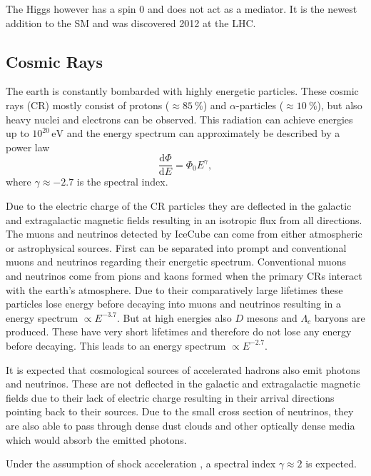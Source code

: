 The Higgs however has a spin $0$ and does not act as a mediator. It is the newest addition to the SM and was discovered 2012 at the LHC\cite{ATLAS:2012yve, CMS:2012qbp}. 

\subsection{Cosmic Rays}
The earth is constantly bombarded with highly energetic particles. These cosmic rays (CR) mostly consist of protons ($\approx \SI{85}{\percent}$) and $\alpha$-particles ($\approx \SI{10}{\percent}$), but also heavy nuclei and electrons can be observed. This radiation can achieve energies up to $10^{20}\,\si{\electronvolt}$ and the energy spectrum can approximately be described by a power law
\begin{equation}
  \frac{\mathrm{d}\Phi}{\mathrm{d}E} = \Phi_0 E^{\gamma},
\end{equation}
where $\gamma \approx - 2.7$ is the spectral index.

Due to the electric charge of the CR particles they are deflected in the galactic and extragalactic magnetic fields resulting in an isotropic flux from all directions.\\

The muons and neutrinos detected by IceCube can come from either atmospheric or astrophysical sources. First can be separated into prompt and conventional muons and neutrinos regarding their energetic spectrum. Conventional muons and neutrinos come from pions and kaons formed when the primary CRs interact with the earth's atmosphere. Due to their comparatively large lifetimes these particles lose energy before decaying into muons and neutrinos resulting in a energy spectrum $\propto E^{-3.7}$. But at high energies also $D$ mesons and $\Lambda_c$ baryons are produced. These have very short lifetimes and therefore do not lose any energy before decaying. This leads to an energy spectrum $\propto E^{-2.7}$.

It is expected that cosmological sources of accelerated hadrons also emit photons and neutrinos. These are not deflected in the galactic and extragalactic magnetic fields due to their lack of electric charge resulting in their arrival directions pointing back to their sources. Due to the small cross section of neutrinos, they are also able to pass through dense dust clouds and other optically dense media which would absorb the emitted photons.

Under the assumption of shock acceleration \cite{Fermi}, a spectral index $\gamma \approx 2$ is expected.
